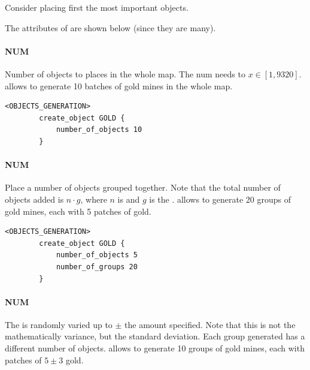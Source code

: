     \begin{note}
        Consider placing first the most important objects.
    \end{note}

    The attributes of  are shown below (since they are many).

    \paragraph{ NUM}

    Number of objects to places in the whole map. The num needs to $x \in [1, 9320]$.  allows to generate 10 batches of gold mines in the whole map.

    \begin{lstlisting}[language={rms}, label={lst:numerofobjects}, caption={Example showing how you can create object in the whole map.}]
        <OBJECTS_GENERATION>
        create_object GOLD {
            number_of_objects 10
        }
    \end{lstlisting}

    \paragraph{ NUM}

    Place a number of objects grouped together. Note that the total number of objects added is $n \cdot g$, where $n$ is  and $g$ is the .  allows to generate 20 groups of gold mines, each with 5 patches of gold.

    \begin{lstlisting}[language={rms}, label={lst:numerofgroups}, caption={Example showing how you can create object in the whole map, grouped together.}]
        <OBJECTS_GENERATION>
        create_object GOLD {
            number_of_objects 5
            number_of_groups 20
        }
    \end{lstlisting}

    \paragraph{ NUM}

    The  is randomly varied up to $\pm$ the amount specified. Note that this is not the mathematically variance, but the standard deviation.
    Each group generated has a different number of objects.  allows to generate 10 groups of gold mines, each with patches of $5 \pm 3$ gold.

